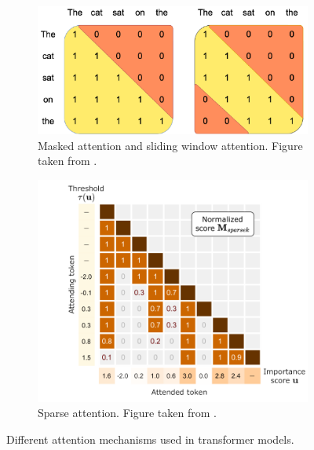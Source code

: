 \begin{figure}[h!]
    \begin{subfigure}[b]{0.58\textwidth}
        \centering
        \includegraphics[width=1\linewidth]{obrazky-figures/slidingwatt.png}
        \caption{Masked attention and sliding window attention. Figure taken from \cite{jiang2023mistral}.}
        \label{att:sliding}
    \end{subfigure}
    \begin{subfigure}[b]{0.38\textwidth}
        \centering
        \includegraphics[width=1\linewidth]{obrazky-figures/sparse.png}
        \caption{Sparse attention. Figure taken from \cite{lou2024sparser}.}
        \label{att:sparse}
    \end{subfigure}
    \caption{Different attention mechanisms used in transformer models.}
    \label{att:main-figure}
\end{figure}


